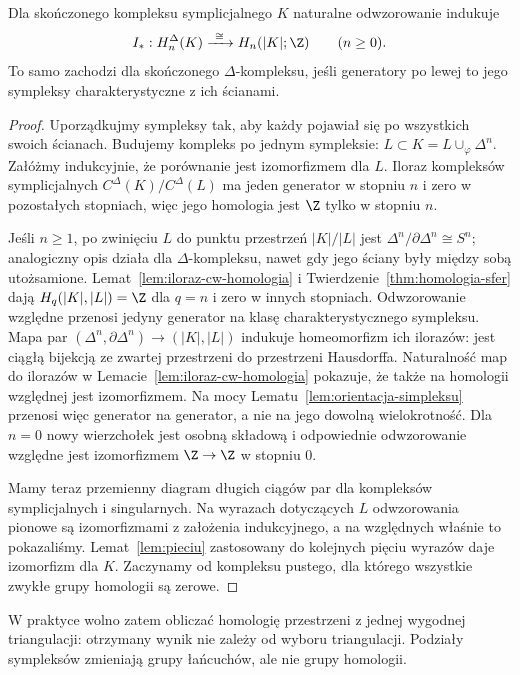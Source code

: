 \begin{twierdzenie}
\label{thm:symplicjalna-singularna}
Dla skończonego kompleksu symplicjalnego
$K$ naturalne odwzorowanie indukuje
\[
 I_*:H_n^\Delta(K)\xrightarrow{\ \cong\ }
 H_n(|K|;\Z)
 \qquad(n\geq0).
\]
To samo zachodzi dla skończonego
$\Delta$-kompleksu, jeśli generatory
po lewej to jego sympleksy
charakterystyczne z ich ścianami.
\end{twierdzenie}
\begin{proof}
Uporządkujmy sympleksy tak, aby
każdy pojawiał się po wszystkich
swoich ścianach. Budujemy kompleks
po jednym sympleksie:
$L\subset K=L\cup_\varphi\Delta^n$.
Załóżmy indukcyjnie, że porównanie
jest izomorfizmem dla $L$.
Iloraz kompleksów symplicjalnych
$C^\Delta(K)/C^\Delta(L)$
ma jeden generator w stopniu $n$
i zero w pozostałych stopniach,
więc jego homologia jest $\Z$
tylko w stopniu $n$.

Jeśli $n\geq1$, po zwinięciu $L$
do punktu przestrzeń $|K|/|L|$
jest $\Delta^n/\partial\Delta^n
\cong S^n$; analogiczny opis
działa dla $\Delta$-kompleksu,
nawet gdy jego ściany były
między sobą utożsamione.
Lemat~\ref{lem:iloraz-cw-homologia}
i Twierdzenie~\ref{thm:homologia-sfer}
dają $H_q(|K|,|L|)=\Z$ dla
$q=n$ i zero w innych stopniach.
Odwzorowanie względne przenosi jedyny
generator na klasę charakterystycznego sympleksu.
Mapa par $(\Delta^n,\partial\Delta^n)\to(|K|,|L|)$
indukuje homeomorfizm ich ilorazów: jest ciągłą bijekcją
ze zwartej przestrzeni do przestrzeni Hausdorffa.
Naturalność map do ilorazów w Lemacie~\ref{lem:iloraz-cw-homologia}
pokazuje, że także na homologii względnej jest izomorfizmem.
Na mocy Lematu~\ref{lem:orientacja-simpleksu} przenosi więc
generator na generator, a nie na jego dowolną wielokrotność.
Dla $n=0$ nowy wierzchołek jest
osobną składową i odpowiednie
odwzorowanie względne jest izomorfizmem
$\Z\to\Z$ w stopniu $0$.

Mamy teraz przemienny diagram
długich ciągów par dla kompleksów
symplicjalnych i singularnych.
Na wyrazach dotyczących $L$
odwzorowania pionowe są izomorfizmami
z założenia indukcyjnego,
a na względnych właśnie
to pokazaliśmy. Lemat~\ref{lem:pieciu}
zastosowany do kolejnych pięciu
wyrazów daje izomorfizm dla $K$.
Zaczynamy od kompleksu pustego,
dla którego wszystkie zwykłe
grupy homologii są zerowe.
\end{proof}

W praktyce wolno zatem obliczać
homologię przestrzeni z jednej
wygodnej triangulacji: otrzymany
wynik nie zależy od wyboru
triangulacji. Podziały sympleksów
zmieniają grupy łańcuchów,
ale nie grupy homologii.

